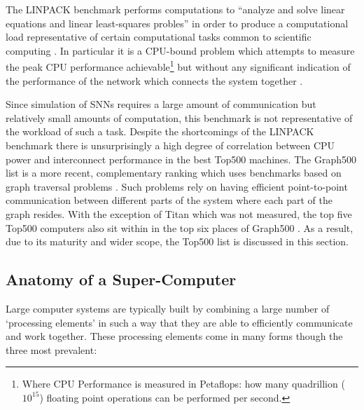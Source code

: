		The LINPACK benchmark performs computations to ``analyze and solve linear
		equations and linear least-squares probles'' in order to produce a
		computational load representative of certain computational tasks common to
		scientific computing \cite{dongarra84}. In particular it is a CPU-bound
		problem which attempts to measure the peak CPU performance
		achievable\footnote{Where CPU Performance is measured in Petaflops: how many
		quadrillion ($10^{15}$) floating point operations can be performed per
		second.} but without any significant indication of the performance of the
		network which connects the system together \cite{dongarra07}.
		
		Since simulation of SNNs requires a large amount of communication but
		relatively small amounts of computation, this benchmark is not
		representative of the workload of such a task. Despite the shortcomings of
		the LINPACK benchmark there is unsurprisingly a high degree of correlation
		between CPU power and interconnect performance in the best Top500 machines.
		The Graph500 list is a more recent, complementary ranking which uses
		benchmarks based on graph traversal problems \cite{murphy10}. Such problems
		rely on having efficient point-to-point communication between different
		parts of the system where each part of the graph resides. With the exception
		of Titan which was not measured, the top five Top500 computers also sit
		within in the top six places of Graph500 \cite{murphy13}. As a result, due
		to its maturity and wider scope, the Top500 list is discussed in this
		section.
		
		\subsection{Anatomy of a Super-Computer}
			
			
			Large computer systems are typically built by combining a large number of
			`processing elements' in such a way that they are able to efficiently
			communicate and work together. These processing elements come in many
			forms though the three most prevalent:
			
